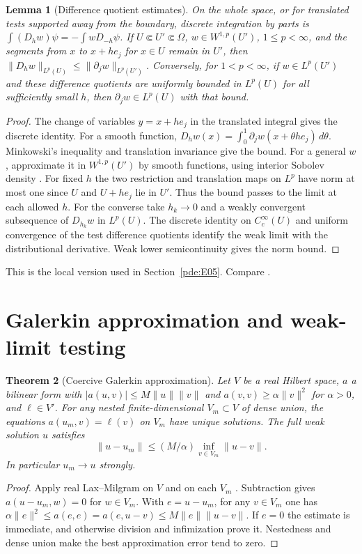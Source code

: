 \documentclass[11pt,oneside,openany]{book}
\theoremstyle{plain}
\newtheorem{theorem}{Theorem}[chapter]
\newtheorem{lemma}[theorem]{Lemma}
\theoremstyle{definition}
\theoremstyle{remark}
\begin{document}
\begin{lemma}[Difference quotient estimates]
\label{lem:pde-difference-quotients}
On the whole space, or for translated tests supported away from
the boundary, discrete integration by parts is
\(\int (D_h w)\psi=-\int w D_{-h}\psi\).
If \(U\Subset U'\Subset\Omega\), \(w\in W^{1,p}(U')\),
\(1\le p<\infty\), and the segments from \(x\) to \(x+h e_j\) for
\(x\in U\) remain in \(U'\), then
\(\|D_h w\|_{L^p(U)}\le\|\partial_j w\|_{L^p(U')}\).
Conversely, for \(1<p<\infty\), if \(w\in L^p(U')\) and these
difference quotients are uniformly bounded in \(L^p(U)\)
for all sufficiently small \(h\), then \(\partial_j w\in L^p(U)\)
with that bound.
\end{lemma}
\begin{proof}
The change of variables \(y=x+h e_j\) in the translated integral
gives the discrete identity. For a smooth function,
\(D_hw(x)=\int_0^1 \partial_jw(x+\theta h e_j)\,d\theta\).
Minkowski's inequality and translation invariance give the bound.
For a general \(w\), approximate it in \(W^{1,p}(U')\) by smooth
functions, using interior Sobolev density \cite[Unit U4]{P102}.
For fixed \(h\) the two restriction and translation maps on \(L^p\)
have norm at most one since \(U\) and \(U+h e_j\) lie in \(U'\).
Thus the bound passes to the limit at each allowed \(h\).
For the converse take \(h_k\to0\) and a weakly convergent subsequence
of \(D_{h_k}w\) in \(L^p(U)\). The discrete identity on
\(C_c^\infty(U)\) and uniform convergence of the test difference
quotients identify the weak limit with the distributional derivative.
Weak lower semicontinuity gives the norm bound.
\end{proof}

This is the local version used in Section~\ref{pde:E05}.
Compare \cite[Section 5.8.2]{Evans}.

\section{Galerkin approximation and weak-limit testing}
\label{pde:C05}

\begin{theorem}[Coercive Galerkin approximation]
\label{thm:pde-cea}
Let \(V\) be a real Hilbert space, \(a\) a bilinear form with
\(|a(u,v)|\le M\|u\|\|v\|\) and \(a(v,v)\ge\alpha\|v\|^2\)
for \(\alpha>0\), and \(\ell\in V'\).
For any nested finite-dimensional \(V_m\subset V\) of dense union,
the equations \(a(u_m,v)=\ell(v)\) on \(V_m\) have unique solutions.
The full weak solution \(u\) satisfies
\[
 \|u-u_m\|\le (M/\alpha)\inf_{v\in V_m}\|u-v\|.
\]
In particular \(u_m\to u\) strongly.
\end{theorem}
\begin{proof}
Apply real Lax--Milgram on \(V\) and on each \(V_m\)
\cite[Chapter 3]{P106}. Subtraction gives
\(a(u-u_m,w)=0\) for \(w\in V_m\). With \(e=u-u_m\),
for any \(v\in V_m\) one has
\(\alpha\|e\|^2\le a(e,e)=a(e,u-v)\le M\|e\|\|u-v\|\).
If \(e=0\) the estimate is immediate, and otherwise division and
infimization prove it. Nestedness and dense union make the
best approximation error tend to zero.
\end{proof}
\end{document}
